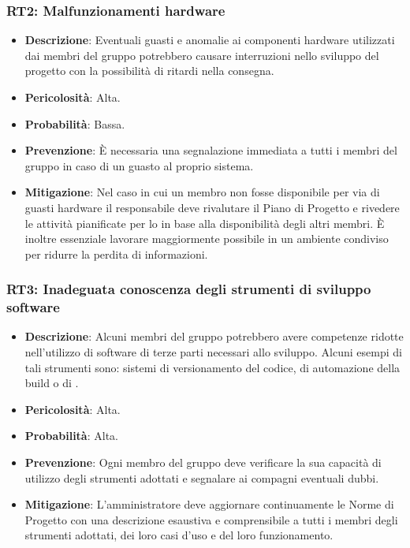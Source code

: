 \subsubsection{RT2: Malfunzionamenti hardware}
\begin{itemize}
    \item \textbf{Descrizione}: Eventuali guasti e anomalie ai componenti hardware utilizzati dai membri del gruppo potrebbero causare 
    interruzioni nello sviluppo del progetto con la possibilità di ritardi nella consegna.
    \item \textbf{Pericolosità}: Alta.
    \item \textbf{Probabilità}: Bassa.
    \item \textbf{Prevenzione}: È necessaria una segnalazione immediata a tutti i membri del gruppo in caso di un guasto al proprio sistema.
    \item \textbf{Mitigazione}: Nel caso in cui un membro non fosse disponibile per via di guasti hardware il responsabile deve rivalutare il Piano di Progetto e rivedere le attività pianificate per lo  in base alla disponibilità degli altri membri.
    È inoltre essenziale lavorare maggiormente possibile in un ambiente condiviso per ridurre la perdita di informazioni.
\end{itemize}

\subsubsection{RT3: Inadeguata conoscenza degli strumenti di sviluppo software}
\begin{itemize}
    \item \textbf{Descrizione}: Alcuni membri del gruppo potrebbero avere competenze ridotte nell'utilizzo di software di terze parti necessari allo sviluppo.
    Alcuni esempi di tali strumenti sono: sistemi di versionamento del codice, di automazione della build o di . 
    \item \textbf{Pericolosità}: Alta.
    \item \textbf{Probabilità}: Alta.
    \item \textbf{Prevenzione}: Ogni membro del gruppo deve verificare la sua capacità di utilizzo degli strumenti adottati e segnalare ai compagni eventuali dubbi.
    \item \textbf{Mitigazione}: L'amministratore deve aggiornare continuamente le Norme di Progetto con una descrizione esaustiva e comprensibile a tutti i membri degli strumenti adottati, dei loro casi d'uso e del loro funzionamento.
\end{itemize}

